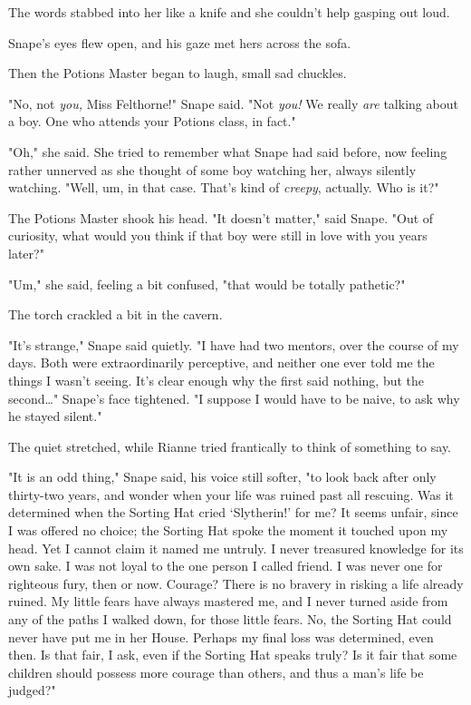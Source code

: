 The words stabbed into her like a knife and she couldn't help gasping out loud.

Snape's eyes flew open, and his gaze met hers across the sofa.

Then the Potions Master began to laugh, small sad chuckles.

"No, not \emph{you,} Miss Felthorne!" Snape said. "Not \emph{you!} We really
\emph{are} talking about a boy. One who attends your Potions class, in fact."

"Oh," she said. She tried to remember what Snape had said before, now feeling
rather unnerved as she thought of some boy watching her, always silently
watching. "Well, um, in that case. That's kind of \emph{creepy}, actually. Who
is it?"

The Potions Master shook his head. "It doesn't matter," said Snape. "Out of
curiosity, what would you think if that boy were still in love with you years
later?"

"Um," she said, feeling a bit confused, "that would be totally pathetic?"

The torch crackled a bit in the cavern.

"It's strange," Snape said quietly. "I have had two mentors, over the course of
my days. Both were extraordinarily perceptive, and neither one ever told me the
things I wasn't seeing. It's clear enough why the first said nothing, but the
second{\ldots}" Snape's face tightened. "I suppose I would have to be naive, to
ask why he stayed silent."

The quiet stretched, while Rianne tried frantically to think of something to
say.

"It is an odd thing," Snape said, his voice still softer, "to look back after
only thirty-two years, and wonder when your life was ruined past all rescuing.
Was it determined when the Sorting Hat cried `Slytherin!' for me? It seems
unfair, since I was offered no choice; the Sorting Hat spoke the moment it
touched upon my head. Yet I cannot claim it named me untruly. I never treasured
knowledge for its own sake. I was not loyal to the one person I called friend.
I was never one for righteous fury, then or now. Courage? There is no bravery
in risking a life already ruined. My little fears have always mastered me, and
I never turned aside from any of the paths I walked down, for those little
fears. No, the Sorting Hat could never have put me in her House. Perhaps my
final loss was determined, even then. Is that fair, I ask, even if the Sorting
Hat speaks truly? Is it fair that some children should possess more courage
than others, and thus a man's life be judged?"

